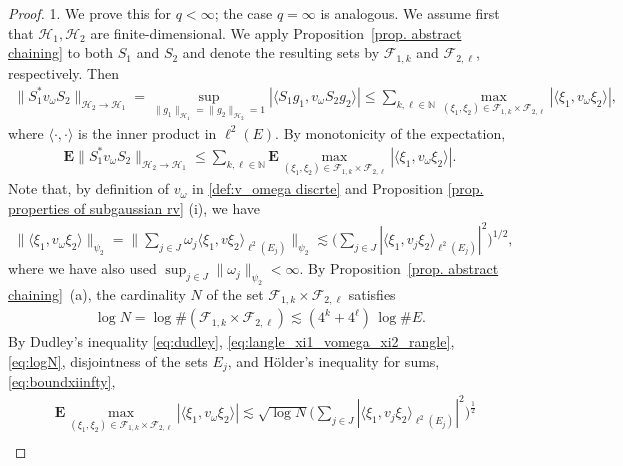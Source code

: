 \documentclass[12pt,reqno]{amsart}
\theoremstyle{definition}
\theoremstyle{remark}
\numberwithin{equation}{section}
\newcommand{\1}{\mathbbm{1}}
\newcommand{\N}{\mathbb{N}}
\begin{document}
\begin{proof} 1. We prove this for $q<\infty$; the case $q=\infty$ is analogous. We assume first that $\mathcal{H}_1,\mathcal{H}_2$ are finite-dimensional.
 We apply Proposition~\ref{prop. abstract chaining} to both $S_1$ and $S_2$ and denote the resulting sets by $\mathcal{F}_{1,k}$ and $\mathcal{F}_{2,\ell}$, respectively. Then
 \begin{align*}
\|S_1^*v_{\omega}S_2\|_{\mathcal{H}_2\to \mathcal{H}_1}
=\sup_{\|g_1\|_{\mathcal{H}_1}=\|g_2\|_{\mathcal{H}_2}=1}|\langle S_1g_1,v_{\omega}S_2g_2\rangle|
\leq \sum_{k,\ell\in \N}\max_{(\xi_1,\xi_2)\in \mathcal{F}_{1,k}\times \mathcal{F}_{2,\ell}}|\langle\xi_1,v_{\omega}\xi_2\rangle|,
 \end{align*}
 where $\langle\cdot,\cdot\rangle$ is the inner product in $\ell^2(E)$. 
 By monotonicity of the expectation,
 \begin{align*}
\mathbf{E}\|S_1^*v_{\omega}S_2\|_{\mathcal{H}_2\to \mathcal{H}_1} \leq \sum_{k,\ell\in \N}\mathbf{E}\max_{(\xi_1,\xi_2)\in \mathcal{F}_{1,k}\times \mathcal{F}_{2,\ell}}|\langle\xi_1,v_{\omega}\xi_2\rangle|.   
 \end{align*}
 Note that, by definition of $v_{\omega}$ in \eqref{def:v_omega discrte} and Proposition \ref{prop. properties of subgaussian rv} (i), we have
\begin{align}\label{eq:langle_xi1_vomega_xi2_rangle}
\|\langle\xi_1,v_{\omega}\xi_2\rangle\|_{\psi_2}
 =\Big\|\sum_{j\in J}\omega_j\langle \xi_1,v\xi_2\rangle_{\ell^2(E_j)}\Big\|_{\psi_2}\lesssim \Big(\sum_{j\in J}|\langle \xi_1,v_j\xi_2\rangle_{\ell^2(E_j)}|^2\Big)^{1/2},
 \end{align}
 where we have also used  $\sup_{j\in J}\|\omega_j\|_{\psi_2}<\infty$.
By Proposition~\ref{prop. abstract chaining}~(a), the cardinality $N$ of the set $\mathcal{F}_{1,k}\times \mathcal{F}_{2,\ell}$ satisfies
\begin{align}\label{eq:logN}
\log N=
    \log\# (\mathcal{F}_{1,k}\times \mathcal{F}_{2,\ell})
    \lesssim (4^k+4^{\ell})\, \log \# E.
\end{align}
By Dudley's inequality \eqref{eq:dudley},
\eqref{eq:langle_xi1_vomega_xi2_rangle}, \eqref{eq:logN}, disjointness of the sets $E_j$, and H\"older's inequality for sums, \eqref{eq:boundxiinfty},
\begin{align*}
  & \mathbf{E}\max_{(\xi_1,\xi_2)\in \mathcal{F}_{1,k}\times \mathcal{F}_{2,\ell}}| \langle\xi_1,v_{\omega}\xi_2\rangle|
  \lesssim \sqrt{\log N}\Big(\sum_{j\in J}|\langle \xi_1,v_j\xi_2\rangle_{\ell^2(E_j)}|^2\Big)^{\frac{1}{2}} \\

\end{align*}
\end{proof}
\end{document}
